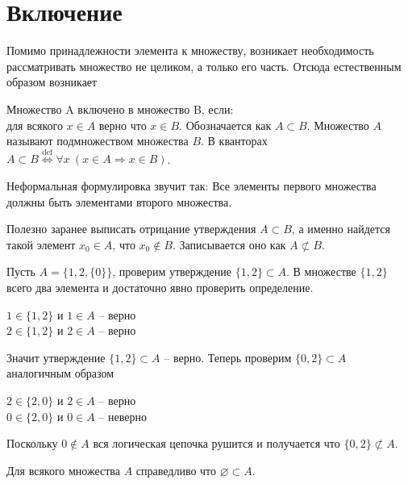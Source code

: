 
\section{Включение}
Помимо принадлежности элемента к множеству, возникает необходимость рассматривать множество не целиком, а только его часть. Отсюда естественным образом возникает 
\begin{definition}\label{def:subset}
Множество A включено в множество B, если:\\
для всякого $x \in A$ верно что $x \in B$.
Обозначается как $A \subset B$. Множество $A$ называют подмножеством множества $B$. В кванторах $A\subset B \overset{\mathrm{def}}{\iff}\forall x\ (x\in A\Rightarrow x\in B)$.

Неформальная формулировка звучит так: Все элементы первого множества должны быть элементами второго множества.

Полезно заранее выписать отрицание утверждения $A \subset B$, а именно найдется такой элемент $x_0 \in A$, что $x_0 \notin B$. Записывается оно как $A \not\subset B$.
\end{definition}
\begin{example}
Пусть $A=\{1,2,\{0\}\}$, проверим утверждение $\{1,2\} \subset A$. В множестве $\{1,2\}$ всего два элемента и достаточно явно проверить определение.
\begin{center}
$1 \in \{1,2\}$ и $1 \in A$ -- верно\\
$2 \in \{1,2\}$ и $2 \in A$ -- верно
\end{center}
Значит утверждение $\{1,2\} \subset A$ -- верно. Теперь проверим $\{0,2\} \subset A$ аналогичным образом
\begin{center}
$2 \in \{2,0\}$ и $2 \in A$ -- верно\\
$0 \in \{2,0\}$ и $0 \in A$ -- неверно
\end{center}
Поскольку $0 \notin A$ вся логическая цепочка рушится и получается что $\{0,2\} \not\subset A$.
\end{example}
\begin{statement}
Для всякого множества $A$ справедливо что $\varnothing \subset A$.
\end{statement}
